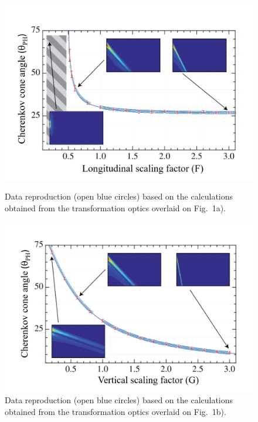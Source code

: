 \begin{figure}
    \centering
    \includegraphics[width=0.8\columnwidth]{SBU_plots/phiVsFoverlayed.png}
    \caption{\label{fig:phiVsF}Data reproduction (open blue circles) based on the calculations obtained from the transformation optics overlaid on \cite{Vginis:2014} Fig.~1a).}
    \includegraphics[width=0.8\columnwidth]{SBU_plots/phiVsGoverlayed.png}
    \caption{\label{fig:phiVsG}Data reproduction (open blue circles) based on the calculations obtained from the transformation optics overlaid on \cite{Vginis:2014} Fig.~1b).}
\end{figure}
